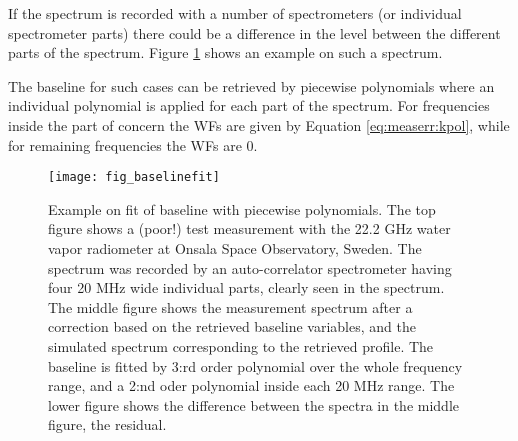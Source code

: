  If the spectrum is recorded with a number of spectrometers (or
 individual spectrometer parts) there could be a difference in the
 level between the different parts of the spectrum. Figure
 \ref{fig:wfuns:baselinefit} shows an example on such a spectrum.
 
 The baseline for such cases can be retrieved by piecewise polynomials
 where an individual polynomial is applied for each part of the
 spectrum. For frequencies inside the part of concern the WFs are
 given by Equation \ref{eq:measerr:kpol}, while for remaining
 frequencies the WFs are 0.  

 \begin{figure}[t]
  \begin{center}
   \texttt{[image: fig\_baselinefit]}
   \caption{Example on fit of baseline with piecewise polynomials.
     The top figure shows a (poor!) test measurement with the 22.2 GHz
     water vapor radiometer at Onsala Space Observatory, Sweden.  The
     spectrum was recorded by an auto-correlator spectrometer having
     four 20 MHz wide individual parts, clearly seen in the spectrum.
     The middle figure shows the measurement spectrum after a
     correction based on the retrieved baseline variables, and the
     simulated spectrum corresponding to the retrieved profile. The
     baseline is fitted by 3:rd order polynomial over the whole
     frequency range, and a 2:nd oder polynomial inside each 20 MHz
     range. The lower figure shows the difference between the spectra
     in the middle figure, the residual.}
   \label{fig:wfuns:baselinefit}
  \end{center}
 \end{figure}



